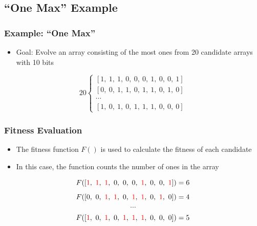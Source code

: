 \documentclass{beamer}
\begin{document}
%


\subsection{``One Max'' Example}
\begin{frame}
  \frametitle{Example: ``One Max''}
\begin{itemize}
\item Goal: Evolve an array consisting of the most ones from 20 candidate arrays with 10 bits
\end{itemize}
\[
20 \left\{\begin{matrix}
[  1,~1,~1,~0,~ 0,~0,~1,~0,~0,~1] \\ %
[  0,~0,~1,~1,~ 0,~1,~1,~0,~1,~0] \\
\cdots\\
[  1 ,~0,~1,~0,~ 1,~1,~1,~0,~0,~0] 
\end{matrix}\right.
\]
\end{frame}

\begin{frame}
  \frametitle{Fitness Evaluation}
\begin{itemize}
\item The fitness function $F()$ is used to calculate the fitness of each candidate
\item In this case, the function counts the number of ones in the array
\end{itemize}

\[F([   \textcolor{red}{1},~\textcolor{red}{1},~ \textcolor{red}{1},~0,~ 0,~0,~\textcolor{red}{1},~ 0,~ 0,~ \textcolor{red}{1}]  ) = 6 \]%
\[F([  0 ,~0,~ \textcolor{red}{1},~ \textcolor{red}{1},~ 0,~ \textcolor{red}{1},~ \textcolor{red}{1},~0,~ \textcolor{red}{1},~0]) = 4\]
\[\cdots\]
\[F([   \textcolor{red}{1},~0,~ \textcolor{red}{1},~0,~  \textcolor{red}{1},~ \textcolor{red}{1},~ \textcolor{red}{1},~0,~0,~0]) = 5\]
\end{frame}
\end{document}
